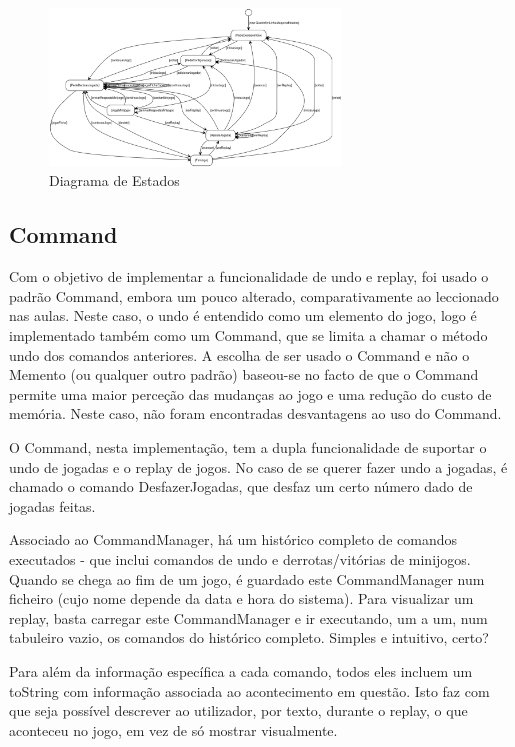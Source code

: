 \documentclass[11pt]{article}
\begin{document}
	 \begin{figure}[h]
	 	\includegraphics[width=0.69\textwidth]{diagrama-estados}
	 	\centering
	 	\caption{Diagrama de Estados}
	 	\label{fig:diag-estados}
	 \end{figure}
	
	\pagebreak
	
	\large
	\subsection{Command}
	\normalsize
	
	Com o objetivo de implementar a funcionalidade de undo e replay, foi usado o padrão Command, embora um pouco alterado, comparativamente ao leccionado nas aulas. Neste caso, o undo é entendido como um elemento do jogo, logo é implementado também como um Command, que se limita a chamar o método undo dos comandos anteriores. A escolha de ser usado o Command e não o Memento (ou qualquer outro padrão) baseou-se no facto de que o Command permite uma maior perceção das mudanças ao jogo e uma redução do custo de memória. Neste caso, não foram encontradas desvantagens ao uso do Command.
	
	O Command, nesta implementação, tem a dupla funcionalidade de suportar o undo de jogadas e o replay de jogos. No caso de se querer fazer undo a jogadas, é chamado o comando DesfazerJogadas, que desfaz um certo número dado de jogadas feitas.
	
	Associado ao CommandManager, há um histórico completo de comandos executados - que inclui comandos de undo e derrotas/vitórias de minijogos. Quando se chega ao fim de um jogo, é guardado este CommandManager num ficheiro (cujo nome depende da data e hora do sistema). Para visualizar um replay, basta carregar este CommandManager e ir executando, um a um, num tabuleiro vazio, os comandos do histórico completo. Simples e intuitivo, certo?
	
	Para além da informação específica a cada comando, todos eles incluem um toString com informação associada ao acontecimento em questão. Isto faz com que seja possível descrever ao utilizador, por texto, durante o replay, o que aconteceu no jogo, em vez de só mostrar visualmente.
	
\end{document}
